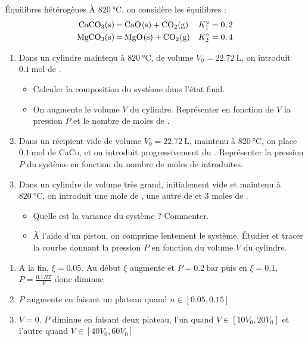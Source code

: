 \documentclass[french, a4paper, 11pt]{article}
\begin{document}
\begin{cadre}{Équilibres hétérogènes}
  À $\SI{820}{\celsius}$, on considère les équilibres :
  \begin{align*}
    \ce{CaCO3(s) &= CaO(s) + CO2(g)}  &K^\circ_1=0,2 \\
    \ce{MgCO3(s) &= MgO(s) + CO2(g)}  &K^\circ_2=0,4
  \end{align*}
  \begin{enumerate}
    \item Dans un cylindre maintenu à $\SI{820}{\celsius}$, de volume $V_0=\SI{22.72}{\liter}$,
      on introduit $\SI{0.1}{\mol}$ de .
      \begin{itemize}
        \item Calculer la composition du système dans l'état final.
        \item On augmente le volume $V$ du cylindre. Représenter en fonction de $V$ la pression $P$ et le nombre de moles de .
      \end{itemize}
    \item Dans un récipient vide de volume $V_0=\SI{22,72}{\liter}$, maintenu à $\SI{820}{\celsius}$, on place $\SI{0,1}{\mol}$ de CaCo, et on introduit progressivement du .
    Représenter la pression $P$ du système en fonction du nombre de moles de  introduites.
    \item Dans un cylindre de volume très grand, initialement vide et maintenu à $\SI{820}{\celsius}$, on introduit une mole de , une autre de  et 3 moles de .
      \begin{itemize}
        \item Quelle est la variance du système ? Commenter.
        \item À l'aide d'un piston, on comprime lentement le système.
          Étudier et tracer la courbe donnant la pression $P$ en fonction du volume $V$ du cylindre.
      \end{itemize}
  \end{enumerate}

  \tcblower
  \begin{enumerate}
    \item A la fin, \(\xi=0.05\). Au début \(\xi\) augmente et \(P=\SI{0.2}{\bar}\) puis en \(\xi=0.1\), \(P=\frac{0.1RT}{V}\) donc diminue
    \item \(P\) augmente en faisant un plateau quand \(n \in [0.05,0.15]\)
    \item \(V=0\). \(P\) diminue en faisant deux plateau, l'un quand \(V\in [10V_0,20V_0]\) et l'autre quand \(V\in [40V_0,60V_0]\)
  \end{enumerate}
\end{cadre}
\end{document}
